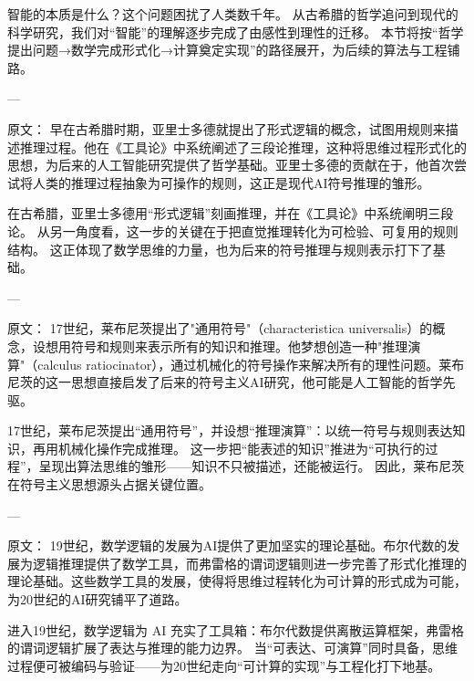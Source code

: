 智能的本质是什么？这个问题困扰了人类数千年。  
从古希腊的哲学追问到现代的科学研究，我们对“智能”的理解逐步完成了由感性到理性的迁移。  
本节将按“哲学提出问题→数学完成形式化→计算奠定实现”的路径展开，为后续的算法与工程铺路。

---

原文：
早在古希腊时期，亚里士多德就提出了形式逻辑的概念，试图用规则来描述推理过程。他在《工具论》中系统阐述了三段论推理，这种将思维过程形式化的思想，为后来的人工智能研究提供了哲学基础。亚里士多德的贡献在于，他首次尝试将人类的推理过程抽象为可操作的规则，这正是现代AI符号推理的雏形。


在古希腊，亚里士多德用“形式逻辑”刻画推理，并在《工具论》中系统阐明三段论。  
从另一角度看，这一步的关键在于把直觉推理转化为可检验、可复用的规则结构。  
这正体现了数学思维的力量，也为后来的符号推理与规则表示打下了基础。

---

原文：
17世纪，莱布尼茨提出了"通用符号"（characteristica universalis）的概念，设想用符号和规则来表示所有的知识和推理。他梦想创造一种"推理演算"（calculus ratiocinator），通过机械化的符号操作来解决所有的理性问题。莱布尼茨的这一思想直接启发了后来的符号主义AI研究，他可能是人工智能的哲学先驱。


17世纪，莱布尼茨提出“通用符号”，并设想“推理演算”：以统一符号与规则表达知识，再用机械化操作完成推理。  
这一步把“能表述的知识”推进为“可执行的过程”，呈现出算法思维的雏形——知识不只被描述，还能被运行。  
因此，莱布尼茨在符号主义思想源头占据关键位置。

---

原文：
19世纪，数学逻辑的发展为AI提供了更加坚实的理论基础。布尔代数的发展为逻辑推理提供了数学工具，而弗雷格的谓词逻辑则进一步完善了形式化推理的理论基础。这些数学工具的发展，使得将思维过程转化为可计算的形式成为可能，为20世纪的AI研究铺平了道路。


进入19世纪，数学逻辑为 AI 充实了工具箱：布尔代数提供离散运算框架，弗雷格的谓词逻辑扩展了表达与推理的能力边界。  
当“可表达、可演算”同时具备，思维过程便可被编码与验证——为20世纪走向“可计算的实现”与工程化打下地基。

